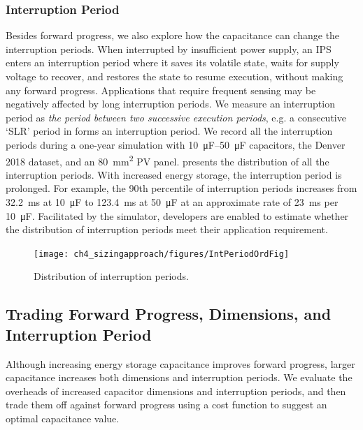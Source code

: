 
\subsubsection{Interruption Period} \label{subsubsec:intper}
Besides forward progress, we also explore how the capacitance can change the interruption periods. 
When interrupted by insufficient power supply, an IPS enters an interruption period where it saves its volatile state, waits for supply voltage to recover, and restores the state to resume execution, without making any forward progress. 
Applications that require frequent sensing may be negatively affected by long interruption periods. 
We measure an interruption period as \textit{the period between two successive execution periods}, e.g. a consecutive `SLR' period in  forms an interruption period. 
We record all the interruption periods during a one-year simulation with \SIrange{10}{50}{\micro\farad} capacitors, the Denver 2018 dataset, and an \SI{80}{\square\milli\meter} PV panel. 
 presents the distribution of all the interruption periods. 
With increased energy storage, the interruption period is prolonged. 
For example, the 90th percentile of interruption periods increases from \SI{32.2}{\milli\second} at \SI{10}{\micro\farad} to \SI{123.4}{\milli\second} at \SI{50}{\micro\farad} at an approximate rate of \SI{23}{\milli\second} per \SI{10}{\micro\farad}. 
Facilitated by the simulator, developers are enabled to estimate whether the distribution of interruption periods meet their application requirement. 



\begin{figure}
    \centering
    \texttt{[image: ch4\_sizingapproach/figures/IntPeriodOrdFig]}
    \caption{Distribution of interruption periods. }
    \label{fig:interruption}
\end{figure}

\subsection{Trading Forward Progress, Dimensions, and Interruption Period} \label{subsec:tradeoff}

Although increasing energy storage capacitance improves forward progress, larger capacitance increases both dimensions and interruption periods. 
We evaluate the overheads of increased capacitor dimensions and interruption periods, and then trade them off against forward progress using a cost function to suggest an optimal capacitance value. 

